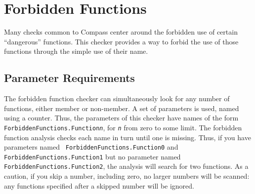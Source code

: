 %
%

\section{Forbidden Functions}
\label{ForbiddenFunctions::overview}
Many checks common to Compass center around the forbidden use of certain ``dangerous'' functions. This checker provides a way to forbid the use of those functions through the simple use of their name.

\subsection{Parameter Requirements}
The forbidden function checker can simultaneously look for any number of
functions, either member or non-member.  A set of parameters is used, named
using a counter.  Thus, the parameters of this checker have names of the
form {\tt ForbiddenFunctions.Function{\it n}}, for {\tt {\it n}} from zero
to some limit.  The forbidden function analysis checks each name in turn
until one is missing.  Thus, if you have parameters named {\tt
ForbiddenFunctions.Function0} and {\tt ForbiddenFunctions.Function1} but no
parameter named {\tt ForbiddenFunctions.Function2}, the analysis will
search for two functions.  As a caution, if you skip a number, including
zero, no larger numbers will be scanned: any functions specified after a
skipped number will be ignored.

